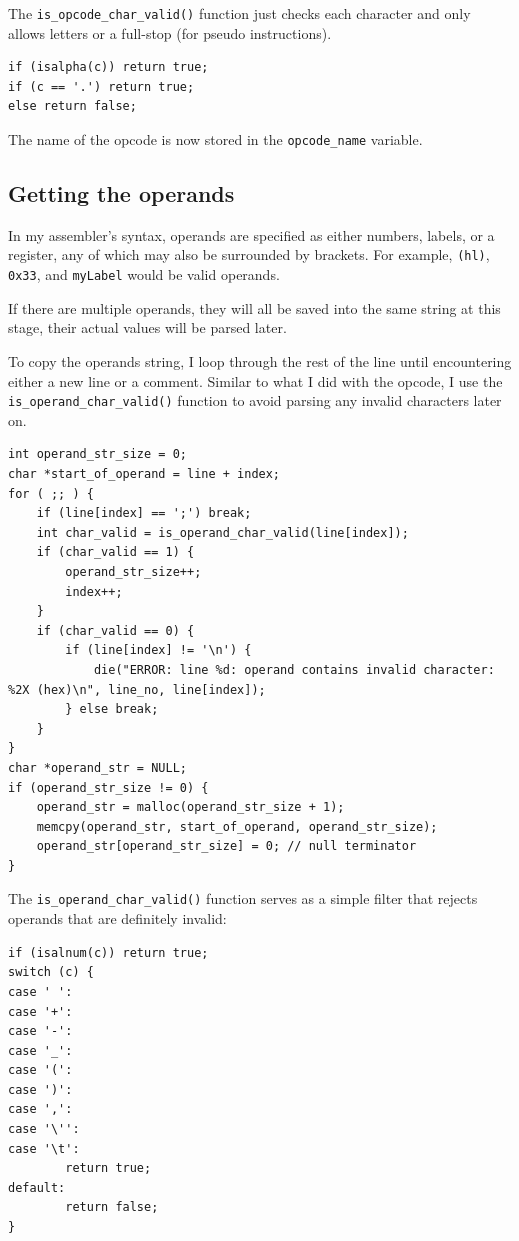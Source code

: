 \documentclass[a4paper]{report}
\begin{document}
The \texttt{is\_opcode\_char\_valid()} function just checks each character and
only allows letters or a full-stop (for pseudo instructions).

\begin{lstlisting}
if (isalpha(c)) return true;
if (c == '.') return true;
else return false;
\end{lstlisting}

The name of the opcode is now stored in the \texttt{opcode\_name} variable.

\subsection{Getting the operands}

In my assembler's syntax, operands are specified as either numbers, labels, or
a register, any of which may also be surrounded by brackets. For example,
\texttt{(hl)}, \texttt{0x33}, and \texttt{myLabel} would be valid operands.

If there are multiple operands, they will all be saved into the same string at
this stage, their actual values will be parsed later.

To copy the operands string, I loop through the rest of the line until
encountering either a new line or a comment. Similar to what I did with the
opcode, I use the \texttt{is\_operand\_char\_valid()} function to avoid parsing
any invalid characters later on.

\begin{lstlisting}
int operand_str_size = 0;
char *start_of_operand = line + index;
for ( ;; ) {
	if (line[index] == ';') break;
	int char_valid = is_operand_char_valid(line[index]);
	if (char_valid == 1) {
		operand_str_size++;
		index++;
	}
	if (char_valid == 0) {
		if (line[index] != '\n') {
			die("ERROR: line %d: operand contains invalid character: %2X (hex)\n", line_no, line[index]);
		} else break;
	}
}
char *operand_str = NULL;
if (operand_str_size != 0) {
	operand_str = malloc(operand_str_size + 1);
	memcpy(operand_str, start_of_operand, operand_str_size);
	operand_str[operand_str_size] = 0; // null terminator
}
\end{lstlisting}

The \texttt{is\_operand\_char\_valid()} function serves as a simple filter that
rejects operands that are definitely invalid:

\begin{lstlisting}
if (isalnum(c)) return true;
switch (c) {
case ' ':
case '+':
case '-':
case '_':
case '(':
case ')':
case ',':
case '\'':
case '\t':
		return true;
default:
		return false;
}
\end{lstlisting}
\end{document}
